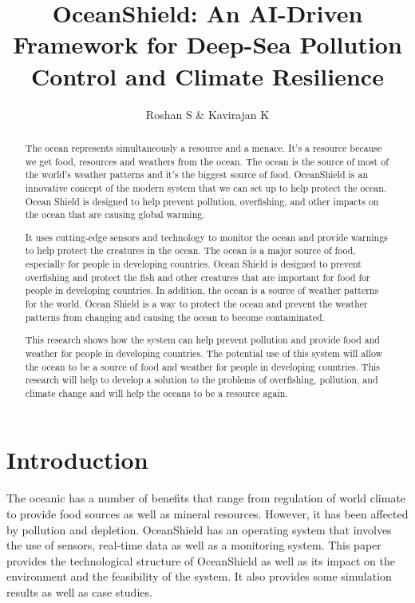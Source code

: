 \documentclass[a4paper]{article}
\title{\textbf{OceanShield: An AI-Driven Framework for Deep-Sea Pollution Control and Climate Resilience}
}
\author{Roshan S   &   Kavirajan K}
\begin{document}
\maketitle

\begin{abstract}

The ocean represents simultaneously a resource and a menace. It’s a resource because we get food, resources and weathers from the ocean. The ocean is the source of most of the world’s weather patterns and it’s the biggest source of food. OceanShield is an innovative concept of the modern system that we can set up to help protect the ocean. Ocean Shield is designed to help prevent pollution, overfishing, and other impacts on the ocean that are causing global warming.

It uses cutting-edge sensors and technology to monitor the ocean and provide warnings to help protect the creatures in the ocean. The ocean is a major source of food, especially for people in developing countries.
Ocean Shield is designed to prevent overfishing and protect the fish and other creatures that are important for food for people in developing countries. In addition, the ocean is a source of weather patterns for the world. Ocean Shield is a way to protect the ocean and prevent the weather patterns from changing and causing the ocean to become contaminated. 

This research shows how the system can help prevent pollution and provide food and weather for people in developing countries. The potential use of this system will allow the ocean to be a source of food and weather for people in developing countries. This research will help to develop a solution to the problems of overfishing, pollution, and climate change and will help the oceans to be a resource again.

\end{abstract}

\section{Introduction}

The oceanic has a number of benefits that range from regulation of world climate to provide food sources as well as mineral resources. However, it has been affected by pollution and depletion. OceanShield has an operating system that involves the use of sensors, real-time data as well as a monitoring system. This paper provides the technological structure of OceanShield as well as its impact on the environment and the feasibility of the system. It also provides some simulation results as well as case studies. 
\end{document}
